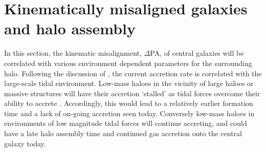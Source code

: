 \section{Kinematically misaligned galaxies and halo assembly} \label{sec:halo_assembly}
In this section, the kinematic misalignment, $\Delta$PA, of central galaxies will be correlated with various environment dependent parameters for the surrounding halo. Following the discussion of \citet{hahn2009}, the current accretion rate is correlated with the large-scale tidal environment. Low-mass haloes in the vicinity of large haloes or massive structures will have their accretion `stalled' as tidal forces overcome their ability to accrete \citep[see also;][]{wang2007,dalal2008,lacerna2011}. Accordingly, this would lead to a relatively earlier formation time and a lack of on-going accretion seen today. Conversely low-mass haloes in environments of low magnitude tidal forces will continue accreting, and could have a late halo assembly time and continued gas accretion onto the central galaxy today. 

